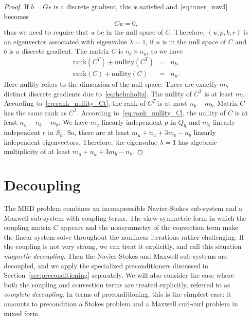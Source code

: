 \documentclass{siamltex}
\begin{document}
\begin{proof}
If $b=Gs$ is a discrete gradient, this is satisfied and~\eqref{eq:inner_row3} becomes
$$Cu=0, $$ thus we need to require that $u$ be in the null space of $C$.
Therefore, $(u, p, b, r)$ is an eigenvector associated with eigenvalue $\lambda = 1$, if $u$ is in the null space of $C$ and $b$ is a discrete gradient.  The matrix $C$ is $n_b \times n_u$, so we have
\begin{eqnarray}
\label{eq:rank_nullity_Ct} \mathrm{rank}(C^T) + \mathrm{nullity}(C^T) &=& n_b,\\
\label{eq:rank_nullity_C} \mathrm{rank}(C) + \mathrm{nullity}(C) &=& n_u.
\end{eqnarray}
Here nullity refers to the dimension of the null space.
There are exactly $m_b$ distinct discrete gradients due to~\eqref{eq:helmholtz}. The nullity of $C^T$ is at least $m_b$. According to~\eqref{eq:rank_nullity_Ct}, the rank of $C^T$ is at most $n_b-m_b$. Matrix $C$ has the same rank as $C^T$. According to~\eqref{eq:rank_nullity_C}, the nullity of $C$ is at least $n_u-n_b+m_b$. We have $m_u$ linearly independent $p$ in $Q_h$ and $m_b$ linearly independent $r$ in $S_h$. So, there are at least $m_u + n_u + 3m_b - n_b$ linearly independent eigenvectors. Therefore, the eigenvalue $\lambda = 1$ has algebraic multiplicity of at least $m_u + n_u + 3m_b - n_b$.
\end{proof}



\section{Decoupling}
\label{sec:decoupling}

The MHD problem combines an incompressible Navier-Stokes sub-system and a  Maxwell sub-system with coupling terms.  The skew-symmetric form in which the coupling matrix $C$ appears and the nonsymmetry of the convection term make the linear system solve throughout the nonlinear iterations rather challenging.
If the coupling is not very strong, we can treat it explicitly, and call this situation {\em magnetic decoupling}.
Then the Navier-Stokes and Maxwell sub-systems are decoupled, and we apply the specialized preconditioners discussed in Section~\ref{sec:preconditioning} separately.
We will also consider the case where both the coupling and convection terms are treated explicitly, referred to as {\em complete
decoupling}. In terms of preconditioning, this is the simplest case: it amounts to precondition a Stokes problem
and a Maxwell curl-curl problem in mixed form.
\end{document}
